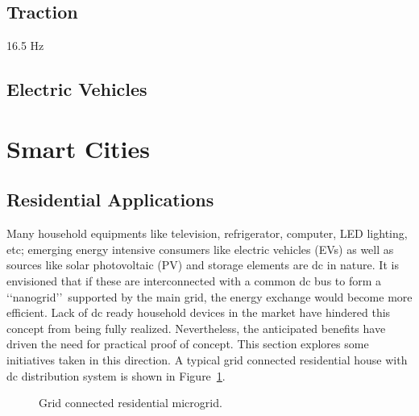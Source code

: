 \documentclass[10pt]{IETBook}
\begin{document}
\subsection{Traction}
16.5 Hz
\subsection{Electric Vehicles}

\section{Smart Cities}

\subsection{Residential Applications}
Many household equipments like television, refrigerator, computer, LED lighting, etc; emerging energy intensive consumers like electric vehicles (EVs) as well as sources like solar photovoltaic (PV) and storage elements are dc in nature. It is envisioned that if these are interconnected with a common dc bus to form a \lq \lq nanogrid\rq \rq \ supported by the main grid, the energy exchange would become more efficient. Lack of dc ready household devices in the market have hindered this concept from being fully realized. Nevertheless, the anticipated benefits have driven the need for practical proof of concept. This section explores some initiatives taken in this direction. A typical grid connected residential house with dc distribution system is shown in Figure~\ref{figresarchi}. 
\begin{figure}[!h]
\centerline{}
\caption{Grid connected residential microgrid.}
\label{figresarchi}
\end{figure}
\end{document}
